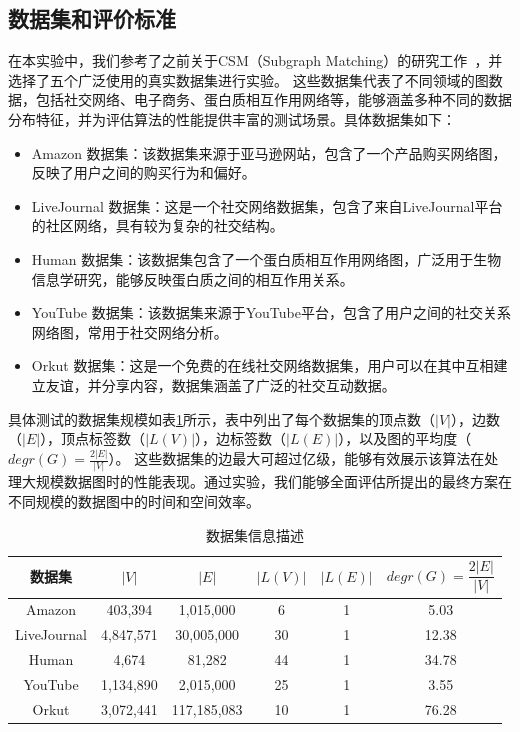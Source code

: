 \subsection{数据集和评价标准}
\label{ss-sec:dataset}
在本实验中，我们参考了之前关于CSM（Subgraph Matching）的研究工作~\cite{csm-survey:DBLP:journals/pvldb/SunSLH22,static-sm:DBLP:conf/sigmod/Sun020}，并选择了五个广泛使用的真实数据集进行实验。
这些数据集代表了不同领域的图数据，包括社交网络、电子商务、蛋白质相互作用网络等，能够涵盖多种不同的数据分布特征，并为评估算法的性能提供丰富的测试场景。具体数据集如下：
\begin{itemize}
\item Amazon 数据集：该数据集来源于亚马逊网站，包含了一个产品购买网络图，反映了用户之间的购买行为和偏好。
\item LiveJournal 数据集：这是一个社交网络数据集，包含了来自LiveJournal平台的社区网络，具有较为复杂的社交结构。
\item Human 数据集：该数据集包含了一个蛋白质相互作用网络图，广泛用于生物信息学研究，能够反映蛋白质之间的相互作用关系。
\item YouTube 数据集：该数据集来源于YouTube平台，包含了用户之间的社交关系网络图，常用于社交网络分析。
\item Orkut 数据集：这是一个免费的在线社交网络数据集，用户可以在其中互相建立友谊，并分享内容，数据集涵盖了广泛的社交互动数据。
\end{itemize}   

具体测试的数据集规模如表\ref{table:dataset}所示，表中列出了每个数据集的顶点数（$|V|$），边数（$|E|$），顶点标签数（$|L(V)|$），边标签数（$|L(E)|$），以及图的平均度（$degr(G)=\frac{2|E|}{|V|}$）。
这些数据集的边最大可超过亿级，能够有效展示该算法在处理大规模数据图时的性能表现。通过实验，我们能够全面评估所提出的最终方案在不同规模的数据图中的时间和空间效率。

\begin{table}[H]
    \centering
    \caption{数据集信息描述}
    \label{table:dataset}
    \begin{tabular}{cccccc}
        \toprule
        数据集   & $|V|$  & $|E|$ & $|L(V)|$ & $ |L(E)|$ & $degr(G)=\dfrac{2|E|}{|V|}$\\
        \midrule
        Amazon    & 403,394 & 1,015,000 & 6 & 1 & 5.03     \\ 
        LiveJournal   & 4,847,571 & 30,005,000 & 30 & 1 & 12.38 \\ 
        Human  & 4,674 & 81,282  & 44 & 1 & 34.78   \\ 
        YouTube  & 1,134,890 & 2,015,000 & 25 & 1 & 3.55  \\ 
        Orkut  & 3,072,441 & 117,185,083 & 10 & 1 & 76.28  \\ 
        \bottomrule
    \end{tabular}
\end{table}


